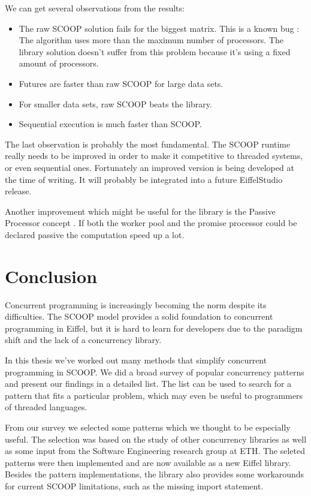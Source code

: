 \documentclass[a4paper,10pt,titlepage]{article}
\begin{document}
We can get several observations from the results:

\begin{itemize}
 \item The raw SCOOP solution fails for the biggest matrix.
 This is a known bug \cite{web:scoop-issues}:
 The algorithm uses more than the maximum number of processors.
 The library solution doesn't suffer from this problem because it's using a fixed amount of processors.
 \item Futures are faster than raw SCOOP for large data sets.
 \item For smaller data sets, raw SCOOP beats the library.
 \item Sequential execution is much faster than SCOOP.
\end{itemize}

The last observation is probably the most fundamental.
The SCOOP runtime really needs to be improved in order to make it competitive to threaded systems, or even sequential ones.
Fortunately an improved version \cite{thesis:scottwest} is being developed at the time of writing.
It will probably be integrated into a future EiffelStudio release.

Another improvement which might be useful for the library is the Passive Processor concept \cite{paper:passive-processors}.
If both the worker pool and the promise processor could be declared passive the computation speed up a lot.

\section{Conclusion}

Concurrent programming is increasingly becoming the norm despite its difficulties.
The SCOOP model provides a solid foundation to concurrent programming in Eiffel, 
but it is hard to learn for developers due to the paradigm shift and the lack of a concurrency library.

In this thesis we've worked out many methods that simplify concurrent programming in SCOOP.
We did a broad survey of popular concurrency patterns and present our findings in a detailed list.
The list can be used to search for a pattern that fits a particular problem, which may even be useful to programmers of threaded languages.

From our survey we selected some patterns which we thought to be especially useful.
The selection was based on the study of other concurrency libraries as well as some input from the Software Engineering research group at ETH.
The seleted patterns were then implemented and are now available as a new Eiffel library.
Besides the pattern implementations, the library also provides some workarounds for current SCOOP limitations, such as the missing import statement.
\end{document}
